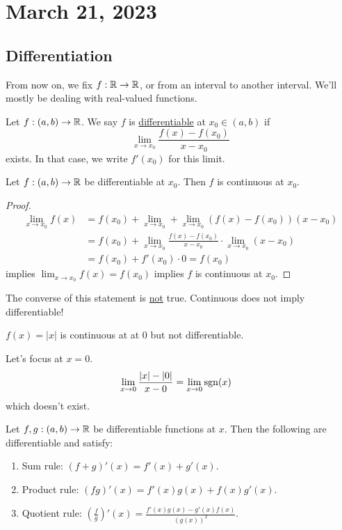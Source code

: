 \section{March 21, 2023}

\subsection{Differentiation}
From now on, we fix $f : \mathbb R \to \mathbb R$, or from an interval to another interval. We'll mostly be dealing with real-valued functions.

\begin{definition}
    Let $f: (a, b)\to \mathbb R$. We say $f$ is \ul{differentiable} at $x_0\in(a, b)$ if
    \[\lim_{x\to x_0} \frac{f(x) - f(x_0)}{x - x_0}\]
    exists. In that case, we write $f'(x_0)$ for this limit.
\end{definition}

\begin{proposition}
    Let $f: (a, b)\to \mathbb R$ be differentiable at $x_0$. Then $f$ is continuous at $x_0$.
\end{proposition}
\begin{proof}
    \begin{align*}
        \lim_{x\to x_0}f(x)
         & = f(x_0) + \lim_{x\to x_0} + \lim_{x\to x_0}\left( f(x) - f(x_0) \right)(x-x_0)       \\
         & = f(x_0) + \lim_{x\to x_0}\frac{f(x) - f(x_0)}{x - x_0}\cdot \lim_{x\to x_0}(x - x_0) \\
         & = f(x_0) + f'(x_0)\cdot 0 = f(x_0)
    \end{align*}
    implies $\lim_{x\to x_0}f(x) = f(x_0)$ implies $f$ is continuous at $x_0$.
\end{proof}
\begin{remark}
    The converse of this statement is \ul{not} true. Continuous does not imply differentiable!
\end{remark}

\begin{example}
    $f(x) = |x|$ is continuous at at $0$ but not differentiable.

    Let's focus at $x = 0$.
    \begin{align*}
        \lim_{x\to 0}\frac{|x| - |0|}{x - 0}
         & = \lim_{x\to 0}\operatorname{\mathrm{sgn}}(x)
    \end{align*}
    which doesn't exist.
\end{example}

\begin{proposition}
    Let $f, g: (a, b)\to \mathbb R$ be differentiable functions at $x$. Then the following are differentiable and satisfy:
    \begin{enumerate}[(1)]
        \item Sum rule: $(f + g)'(x) = f'(x) + g'(x)$.
        \item Product rule: $(fg)'(x) = f'(x)g(x) + f(x)g'(x)$.
        \item Quotient rule: $\left( \frac{f}{g} \right)'(x) = \frac{f'(x)g(x) - g'(x)f(x)}{(g(x))^2}$.
    \end{enumerate}
\end{proposition}

